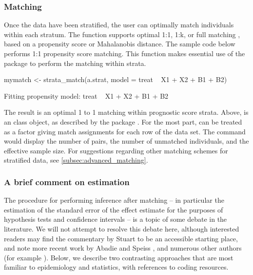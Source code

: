 \subsubsection{Matching} \label{subsubsec:simulated_matching}

Once the data have been stratified, the user can optimally match individuals within each stratum. The  function supports optimal 1:1, 1:k, or full matching \citep{rosenbaum1991fullmatch, hansen2006optmatch}, based on a propensity score or Mahalanobis distance. The sample code below performs 1:1 propensity score matching. This function makes essential use of the  package \citep{hansen2006optmatch, RELAX1988} to perform the matching within strata.

\begin{example}
mymatch <- strata_match(a.strat, model = treat ~ X1 + X2 + B1 + B2)
\end{example}
\begin{example}
Fitting propensity model: treat ~ X1 + X2 + B1 + B2
\end{example}

The result is an optimal 1 to 1 matching within prognostic score strata. Above,  is an  class object, as described by the  package \citep{hansen2006optmatch}.  For the most part,  can be treated as a factor giving match assignments for each row of the data set. The command  would display the number of pairs, the number of unmatched individuals, and the effective sample size. For suggestions regarding other matching schemes for stratified data, see \ref{subsec:advanced_matching}.

\subsubsection{A brief comment on estimation}

The procedure for performing inference after matching -- in particular the estimation of the standard error of the effect estimate for the purposes of hypothesis tests and confidence intervals -- is a topic of some debate in the literature.  We will not attempt to resolve this debate here, although interested readers may find the commentary by Stuart \citep{stuart2010matching} to be an accessible starting place, and note more recent work by Abadie and Speiss \citep{abadie2021robust}, and numerous other authors (for example \citet{abadie2006large, abadie2011bias, austin2014boot, austin2020variance}). Below, we describe two contrasting approaches that are most familiar to epidemiology and statistics, with references to coding resources.

